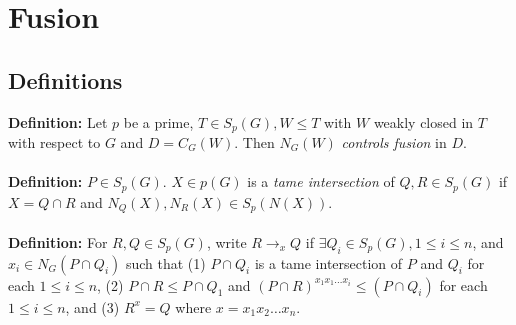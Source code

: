 \chapter{Fusion}
\section {Definitions}
{\bf Definition:}
Let $p$ be a prime, $T \in S_p(G), W \le T$ with $W$ weakly closed in $T$ with respect
to $G$ and $D=C_G (W)$.  Then $N_G(W)$ \emph{controls fusion} in $D$.
\\
\\
{\bf Definition:}
$P \in S_p(G)$.  $X \in p(G)$ is a \emph {tame intersection} of
$Q, R \in S_p (G)$ if $X= Q \cap R$ and $N_Q (X), N_R (X) \in S_p(N(X))$.
\\
\\
{\bf Definition:}
For $R, Q \in S_p(G)$, write $R \rightarrow_x Q$ if $\exists Q_i \in S_p(G), 1 \le i \le n$,
and $x_i \in N_G(P \cap Q_i)$ such that (1) $P \cap Q_i$ is a tame intersection of
$P$ and $Q_i$ 
for each $1 \le i \le n$,
(2) $P \cap R \le P \cap Q_1$ and $(P \cap R)^{x_1 x_1 \ldots x_i} \le (P \cap Q_i)$
for each $1 \le i \le n$, and
(3) $R^x=Q$ where $x= x_1 x_2 \ldots x_n$.
